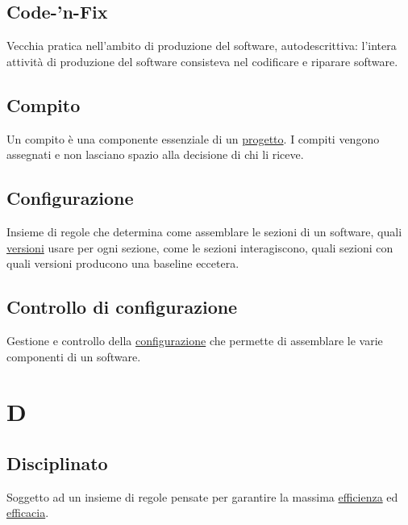 	\subsection{Code-'n-Fix}
	\label{sec:codenfix}
	Vecchia pratica nell'ambito di produzione del software, autodescrittiva: l'intera attività di produzione del software consisteva nel codificare e riparare software.
	
	\subsection{Compito}
	\label{sec:compiti}
	Un compito è una componente essenziale di un \hyperref[sec:progetto]{progetto}. I compiti vengono assegnati e non lasciano spazio alla decisione di chi li riceve.
	
	\subsection{Configurazione}
	\label{sec:configurazione}
	Insieme di regole che determina come assemblare le sezioni di un software, quali \hyperref[sec:versione]{versioni} usare per ogni sezione, come le sezioni interagiscono, quali sezioni con quali versioni producono una baseline eccetera.
	
	\subsection{Controllo di configurazione}
	\label{sec:controlloconfigurazione}
	Gestione e controllo della \hyperref[sec:configurazione]{configurazione} che permette di assemblare le varie componenti di un software.\newpage

	
	\section{D}

	\subsection{Disciplinato}
	\label{sec:disciplinato}
	Soggetto ad un insieme di regole pensate per garantire la massima \hyperref[sec:efficienza]{efficienza} ed \hyperref[sec:efficacia]{efficacia}.\newpage

